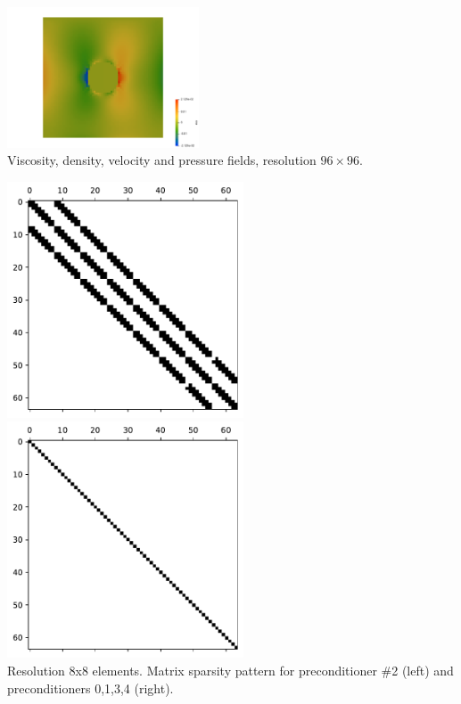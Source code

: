 \begin{center}
\includegraphics[width=5.7cm]{python_codes/fieldstone_16/results/visc_field_1/exy}\\
{\captionfont Viscosity, density, velocity and pressure fields, resolution $96\times 96$.}
\end{center} 

\begin{center} 
\includegraphics[width=7cm]{python_codes/fieldstone_16/results/visc_field_1/matrix_ps2}
\includegraphics[width=7cm]{python_codes/fieldstone_16/results/visc_field_1/matrix_ps3}\\
{\captionfont Resolution 8x8 elements. Matrix sparsity pattern 
for preconditioner \#2 (left) and preconditioners 0,1,3,4 (right).}
\end{center}



